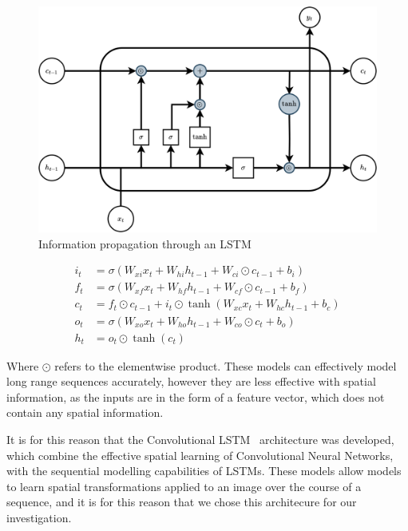 \documentclass[twocolumn]{article}
\begin{document}
\begin{figure}
    \centering
    \includegraphics[scale=0.125]{assets/lstm.png}
    \caption{Information propagation through an LSTM}
    \label{fig:lstm}
\end{figure}

\begin{equation}
    \begin{aligned}
    i_t &= \sigma(W_{xi}x_t + W_{hi}h_{t-1} + W_{ci} \odot c_{t-1}+b_i) \\
    f_t &= \sigma(W_{xf}x_t + W_{hf}h_{t-1} + W_{cf} \odot c_{t-1}+b_f) \\
    c_t &= f_t \odot c_{t-1} + i_t \odot \tanh(W_{xc}x_t + W_{hc}h_{t-1}+b_c) \\
    o_t &= \sigma(W_{xo}x_t + W_{ho}h_{t-1} + W_{co} \odot c_{t}  +b_o) \\
    h_t &= o_t \odot \tanh(c_t)
    \end{aligned}
    \label{eq:lstm}
\end{equation}

Where $\odot$ refers to the elementwise product. These models can effectively model long range sequences accurately, however they are less effective with spatial information, as the inputs are in the form of a feature vector, which does not contain any spatial information. 

It is for this reason that the Convolutional LSTM~\cite{shi2015convolutionallstmnetworkmachine} architecture was developed, which combine the effective spatial learning of Convolutional Neural Networks, with the sequential modelling capabilities of LSTMs. These models allow models to learn spatial transformations applied to an image over the course of a sequence, and it is for this reason that we chose this architecure for our investigation.  
\end{document}
